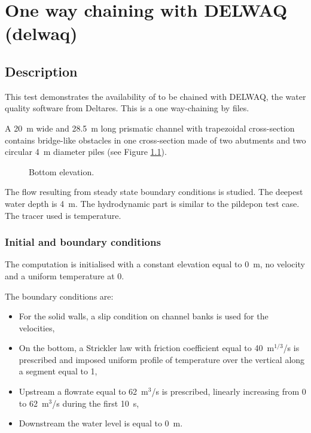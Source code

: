 \chapter{One way chaining with DELWAQ (delwaq)}

\section{Description}

This test demonstrates the availability of  to be chained
with DELWAQ, the water quality software from Deltares.
This is a one way-chaining by files.

A 20~m wide and 28.5~m long prismatic channel with trapezoidal cross-section
contains bridge-like obstacles in one cross-section made of two abutments and two
circular 4~m diameter piles (see Figure \ref{t3d:delwaq:fig:Bottom}).

\begin{figure}[!htbp]
 \centering
 \caption{Bottom elevation.}
 \label{t3d:delwaq:fig:Bottom}
\end{figure}

The flow resulting from steady state boundary conditions is studied.
The deepest water depth is 4~m.
The hydrodynamic part is similar to the pildepon test case.
The tracer used is temperature.

\subsection{Initial and boundary conditions}

The computation is initialised with a constant elevation equal to 0~m,
no velocity and a uniform temperature at 0.

The boundary conditions are:
\begin{itemize}
\item For the solid walls, a slip condition on channel banks is used for the
velocities,
\item On the bottom, a Strickler law with friction coefficient equal to
40~m$^{1/3}$/s is prescribed
and imposed uniform profile of temperature over the vertical along
a segment equal to 1,
\item Upstream a flowrate equal to 62~m$^3$/s is prescribed,
linearly increasing from 0 to 62~m$^3$/s during the first 10~s,
\item Downstream the water level is equal to 0~m.
\end{itemize}

